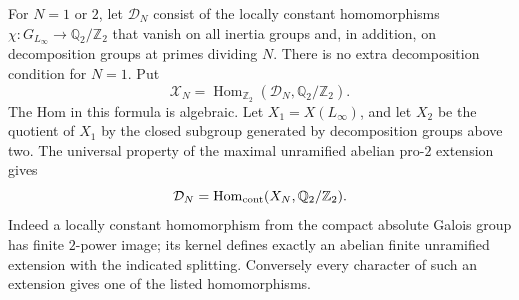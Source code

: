 For \(N=1\) or \(2\), let \(\mathcal D_N\) consist of the locally
constant homomorphisms
\(\chi:G_{L_\infty}\to\mathbb Q_2/\mathbb Z_2\) that vanish on all
inertia groups and, in addition, on decomposition groups at primes
dividing \(N\). There is no extra decomposition condition for \(N=1\).
Put
\[
 \mathcal X_N=\operatorname{Hom}_{\mathbb Z_2}
             (\mathcal D_N,\mathbb Q_2/\mathbb Z_2).
\]
The Hom in this formula is algebraic.
Let \(X_1=X(L_\infty)\), and let \(X_2\) be the quotient of \(X_1\)
by the closed subgroup generated by decomposition groups above two.
The universal property of the maximal unramified abelian pro-\(2\)
extension gives
\[
 \mathcal D_N=\operatorname{Hom}_{\rm cont}
               (X_N,\mathbb Q_2/\mathbb Z_2).
\]
Indeed a locally constant homomorphism from the compact absolute
Galois group has finite \(2\)-power image; its kernel defines exactly
an abelian finite unramified extension with the indicated splitting.
Conversely every character of such an extension gives one of the
listed homomorphisms.

